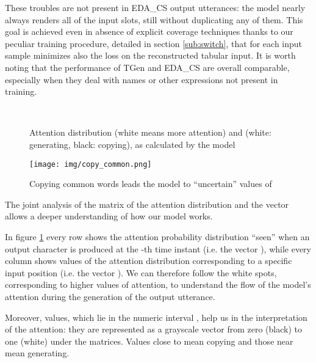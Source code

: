 \documentclass[runningheads, envcountsame, a4paper]{llncs}
\begin{document}
 These troubles are not present in EDA\_CS output utterances: the model nearly always renders all of the input slots, still without duplicating any of them. This goal is achieved even in absence of explicit coverage techniques thanks to our peculiar training procedure, detailed in section \ref{sub:switch}, that for each input sample minimizes also the loss on the reconstructed tabular input. It is worth noting that the performance of TGen and EDA\_CS are overall comparable, especially when they deal with names or other expressions not present in training. 

\begin{figure}
    \centering
     \\

    \caption[Attention and ]{Attention distribution (white means more attention) and  (white: generating, black: copying), as calculated by the model}
    \label{fig:attention}
\end{figure}

\begin{figure}
    \centering
    \texttt{[image: img/copy\_common.png]}
    \caption{Copying common words leads the model to ``uncertain'' values of }
    \label{fig:common}
\end{figure}

The joint analysis of the matrix of the attention distribution  and the vector  allows a deeper understanding of how our model works. 

In figure \ref{fig:attention} every row shows the attention probability distribution ``seen'' when an output character is produced at the -th time instant (i.e. the vector ), while every column shows values of the attention distribution corresponding to a specific input position  (i.e. the vector ). We can therefore follow the white spots, corresponding to higher values of attention, to understand the flow of the model's attention during the generation of the output utterance. 

Moreover,  values, which lie in the numeric interval , help us in the interpretation of the attention: they are represented as a grayscale vector from zero (black) to one (white) under the matrices. Values close to  mean copying and those near  mean generating.
\end{document}
